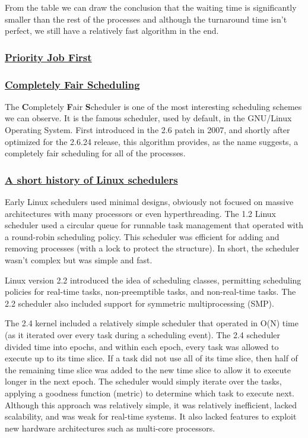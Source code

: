\documentclass{article}
\begin{document}
From the table we can draw the conclusion that the waiting time is significantly smaller than the rest of the processes and although the turnaround time isn't perfect, we still have a relatively fast algorithm in the end.

\subsubsection{\underline{Priority Job First}}

\subsubsection{\underline{Completely Fair Scheduling}}

The \textbf{C}ompletely \textbf{F}air \textbf{S}cheduler is one of the most interesting scheduling schemes we can observe. It is the famous scheduler, used by default, in the GNU/Linux Operating System. First introduced in the 2.6 patch in 2007, and shortly after optimized for the 2.6.24 release, this algorithm provides, as the name suggests, a completely fair scheduling for all of the processes.

\subsubsection{\underline{A short history of Linux schedulers}}

Early Linux schedulers used minimal designs, obviously not focused on massive architectures with many processors or even hyperthreading. The 1.2 Linux scheduler used a circular queue for runnable task management that operated with a round-robin scheduling policy. This scheduler was efficient for adding and removing processes (with a lock to protect the structure). In short, the scheduler wasn’t complex but was simple and fast.

Linux version 2.2 introduced the idea of scheduling classes, permitting scheduling policies for real-time tasks, non-preemptible tasks, and non-real-time tasks. The 2.2 scheduler also included support for symmetric multiprocessing (SMP).

The 2.4 kernel included a relatively simple scheduler that operated in O(N) time (as it iterated over every task during a scheduling event). The 2.4 scheduler divided time into epochs, and within each epoch, every task was allowed to execute up to its time slice. If a task did not use all of its time slice, then half of the remaining time slice was added to the new time slice to allow it to execute longer in the next epoch. The scheduler would simply iterate over the tasks, applying a goodness function (metric) to determine which task to execute next. Although this approach was relatively simple, it was relatively inefficient, lacked scalability, and was weak for real-time systems. It also lacked features to exploit new hardware architectures such as multi-core processors.
\end{document}
